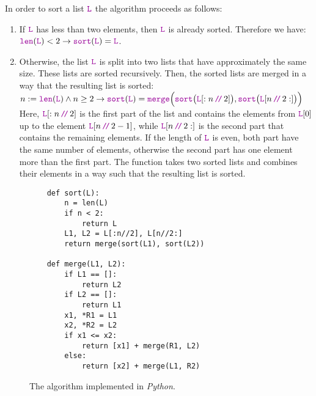 In order to sort a list $\mytt{L}$ the algorithm proceeds as follows:
\begin{enumerate}
\item If $\mytt{L}$ has less than two elements, then $\mytt{L}$ is already sorted.  Therefore we have: 
      \\[0.2cm]
      \hspace*{0.3cm}
      $\mytt{len}(\mytt{L}) < 2 \rightarrow \mytt{sort}(\mytt{L}) = \mytt{L}$.
\item Otherwise, the list $\mytt{L}$ is split into two lists that have approximately the same size.
      These lists are sorted recursively.  Then, the sorted lists are merged in a way that the
      resulting list is sorted: \\[0.2cm]
      \hspace*{0.3cm} 
      $n := \mytt{len}(\mytt{L}) \wedge n \geq 2 \rightarrow \mytt{sort}(\mytt{L}) =
         \mytt{merge}\Bigl(\mytt{sort}\bigl(\mytt{L}[:n\dv 2]\bigr),
         \mytt{sort}\bigl(\mytt{L}[n\dv 2:]\bigr)\Bigr)
     $
      \\[0.2cm]
      Here,  $\mytt{L}[:n\dv 2]$ is the first part of the list and contains the elements from $\mytt{L}[0]$ up
      to the element $\mytt{L}[n\dv 2-1]$, while
      $\mytt{L}[n\dv 2:]$ is the second part that contains the remaining elements.  If the length of $\mytt{L}$ is
      even, both part have the same number of elements, otherwise the second part has one element more than the
      first part.  The function  takes two sorted lists and combines their elements in a way such that
      the resulting list is sorted. 
\end{enumerate}


\begin{figure}[!ht]
  \centering
\begin{verbatim}
    def sort(L):
        n = len(L)
        if n < 2:
            return L
        L1, L2 = L[:n//2], L[n//2:]
        return merge(sort(L1), sort(L2))
    
    def merge(L1, L2):
        if L1 == []:
            return L2
        if L2 == []:
            return L1
        x1, *R1 = L1
        x2, *R2 = L2
        if x1 <= x2:
            return [x1] + merge(R1, L2)
        else:
            return [x2] + merge(L1, R2)
\end{verbatim}
\vspace*{-0.3cm}
  \caption{The  algorithm implemented in \textsl{Python}.}
  \label{fig:merge-sort.stlx}
\end{figure}


